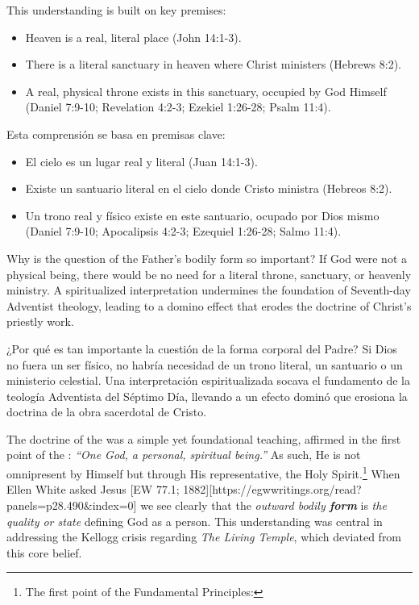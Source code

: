 This understanding is built on key premises:
\begin{itemize}
    \item Heaven is a real, literal place (John 14:1-3).
    \item There is a literal sanctuary in heaven where Christ ministers (Hebrews 8:2). 
    \item A real, physical throne exists in this sanctuary, occupied by God Himself (Daniel 7:9-10; Revelation 4:2-3; Ezekiel 1:26-28; Psalm 11:4).
\end{itemize}


Esta comprensión se basa en premisas clave:
\begin{itemize}
    \item El cielo es un lugar real y literal (Juan 14:1-3).
    \item Existe un santuario literal en el cielo donde Cristo ministra (Hebreos 8:2). 
    \item Un trono real y físico existe en este santuario, ocupado por Dios mismo (Daniel 7:9-10; Apocalipsis 4:2-3; Ezequiel 1:26-28; Salmo 11:4).
\end{itemize}


Why is the question of the Father’s bodily form so important? If God were not a physical being, there would be no need for a literal throne, sanctuary, or heavenly ministry. A spiritualized interpretation undermines the foundation of Seventh-day Adventist theology, leading to a domino effect that erodes the doctrine of Christ’s priestly work.


¿Por qué es tan importante la cuestión de la forma corporal del Padre? Si Dios no fuera un ser físico, no habría necesidad de un trono literal, un santuario o un ministerio celestial. Una interpretación espiritualizada socava el fundamento de la teología Adventista del Séptimo Día, llevando a un efecto dominó que erosiona la doctrina de la obra sacerdotal de Cristo.


The doctrine of the  was a simple yet foundational teaching, affirmed in the first point of the : \textit{“One God, a personal, spiritual being.”} As such, He is not omnipresent by Himself but through His representative, the Holy Spirit.\footnote{The first point of the Fundamental Principles: } When Ellen White asked Jesus [EW 77.1; 1882][https://egwwritings.org/read?panels=p28.490&index=0] we see clearly that the \textit{outward bodily \textbf{form}} is \textit{the quality or state} defining God as a person. This understanding was central in addressing the Kellogg crisis regarding \textit{The Living Temple}, which deviated from this core belief.


